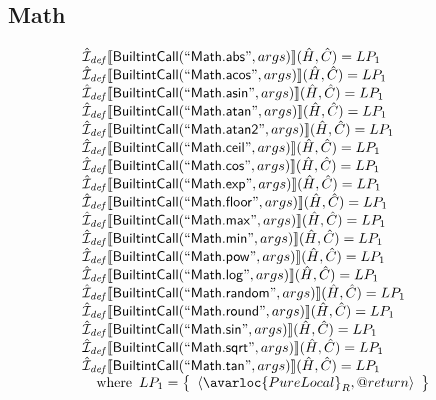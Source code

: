 \subsection{Math}
\[
\begin{array}{l}

\aI_{\it def}\lbr \SF{BuiltintCall}(``\SF{Math.abs}",args)\rbr(\hat{H},\hat{C}) = LP_1\\
\aI_{\it def}\lbr \SF{BuiltintCall}(``\SF{Math.acos}",args)\rbr(\hat{H},\hat{C}) = LP_1\\
\aI_{\it def}\lbr \SF{BuiltintCall}(``\SF{Math.asin}",args)\rbr(\hat{H},\hat{C}) = LP_1\\
\aI_{\it def}\lbr \SF{BuiltintCall}(``\SF{Math.atan}",args)\rbr(\hat{H},\hat{C})= LP_1\\
\aI_{\it def}\lbr \SF{BuiltintCall}(``\SF{Math.atan2}",args)\rbr(\hat{H},\hat{C})= LP_1\\
\aI_{\it def}\lbr \SF{BuiltintCall}(``\SF{Math.ceil}",args)\rbr(\hat{H},\hat{C})= LP_1\\
\aI_{\it def}\lbr \SF{BuiltintCall}(``\SF{Math.cos}",args)\rbr(\hat{H},\hat{C})= LP_1\\
\aI_{\it def}\lbr \SF{BuiltintCall}(``\SF{Math.exp}",args)\rbr(\hat{H},\hat{C})= LP_1\\
\aI_{\it def}\lbr \SF{BuiltintCall}(``\SF{Math.floor}",args)\rbr(\hat{H},\hat{C})= LP_1\\
\aI_{\it def}\lbr \SF{BuiltintCall}(``\SF{Math.max}",args)\rbr(\hat{H},\hat{C})= LP_1\\
\aI_{\it def}\lbr \SF{BuiltintCall}(``\SF{Math.min}",args)\rbr(\hat{H},\hat{C})= LP_1\\
\aI_{\it def}\lbr \SF{BuiltintCall}(``\SF{Math.pow}",args)\rbr(\hat{H},\hat{C})= LP_1\\
\aI_{\it def}\lbr \SF{BuiltintCall}(``\SF{Math.log}",args)\rbr(\hat{H},\hat{C})= LP_1\\
\aI_{\it def}\lbr \SF{BuiltintCall}(``\SF{Math.random}",args)\rbr(\hat{H},\hat{C})= LP_1\\
\aI_{\it def}\lbr \SF{BuiltintCall}(``\SF{Math.round}",args)\rbr(\hat{H},\hat{C})= LP_1\\
\aI_{\it def}\lbr \SF{BuiltintCall}(``\SF{Math.sin}",args)\rbr(\hat{H},\hat{C})= LP_1\\
\aI_{\it def}\lbr \SF{BuiltintCall}(``\SF{Math.sqrt}",args)\rbr(\hat{H},\hat{C})= LP_1\\
\aI_{\it def}\lbr \SF{BuiltintCall}(``\SF{Math.tan}",args)\rbr(\hat{H},\hat{C})= LP_1\\
\quad\wherec{
  LP_1 = \set{\langle\avarloc{PureLocal}_R,\varprop{return}\rangle}\\
  }\\
\\

\end{array}
\]

